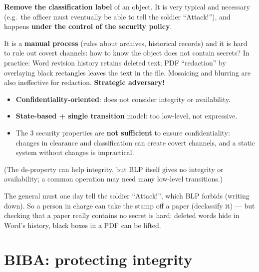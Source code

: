 \begin{defnbox}[title=Declassification]
\textbf{Remove the classification label} of an object. It is very typical and necessary
(e.g.\ the officer must eventually be able to tell the soldier ``Attack!''), and happens
\textbf{under the control of the security policy}.
\end{defnbox}

\begin{warnbox}[title=Declassification cannot be made inherently safe]
It is a \textbf{manual process} (rules about archives, historical records) and it is hard
to rule out covert channels: how to know the object does not contain secrets? In
practice: Word revision history retains deleted text; PDF ``redaction'' by overlaying
black rectangles leaves the text in the file. Mosaicing and blurring are also ineffective
for redaction. \textbf{Strategic adversary!}
\end{warnbox}

\begin{warnbox}[title=BLP limitations]
\begin{itemize}
  \item \textbf{Confidentiality-oriented}: does not consider integrity or availability.
  \item \textbf{State-based + single transition} model: too low-level, not expressive.
  \item The 3 security properties are \textbf{not sufficient} to ensure
        confidentiality: changes in clearance and classification can create covert
        channels, and a static system without changes is impractical.
\end{itemize}
(The ds-property can help integrity, but BLP itself gives no integrity or availability; a common
operation may need many low-level transitions.)
\end{warnbox}

\begin{goatbox}
The general must one day tell the soldier ``Attack!'', which BLP forbids (writing down). So a
person in charge can take the stamp off a paper (declassify it) --- but checking that a paper
really contains no secret is hard: deleted words hide in Word's history, black boxes in a PDF
can be lifted.
\end{goatbox}

\section{BIBA: protecting integrity}

